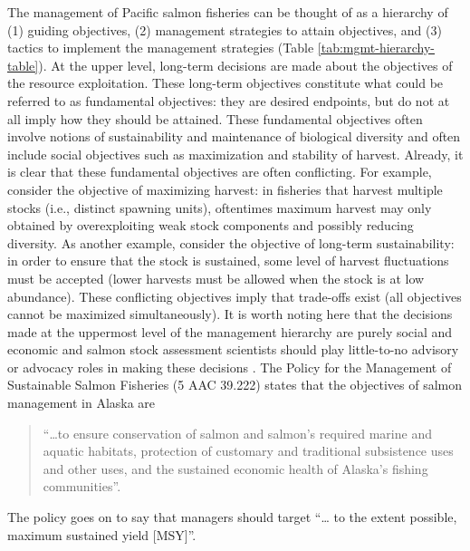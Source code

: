 \documentclass[12pt,]{book}
\theoremstyle{definition}
\theoremstyle{definition}
\theoremstyle{definition}
\theoremstyle{remark}
\begin{document}
The management of Pacific salmon fisheries can be thought of as a
hierarchy of (1) guiding objectives, (2) management strategies to attain
objectives, and (3) tactics to implement the management strategies
(Table \ref{tab:mgmt-hierarchy-table}). At the upper level, long-term
decisions are made about the objectives of the resource exploitation.
These long-term objectives constitute what could be referred to as
fundamental objectives: they are desired endpoints, but do not at all
imply how they should be attained. These fundamental objectives often
involve notions of sustainability and maintenance of biological
diversity and often include social objectives such as maximization and
stability of harvest. Already, it is clear that these fundamental
objectives are often conflicting. For example, consider the objective of
maximizing harvest: in fisheries that harvest multiple stocks (i.e.,
distinct spawning units), oftentimes maximum harvest may only obtained
by overexploiting weak stock components and possibly reducing diversity.
As another example, consider the objective of long-term sustainability:
in order to ensure that the stock is sustained, some level of harvest
fluctuations must be accepted (lower harvests must be allowed when the
stock is at low abundance). These conflicting objectives imply that
trade-offs exist (all objectives cannot be maximized simultaneously). It
is worth noting here that the decisions made at the uppermost level of
the management hierarchy are purely social and economic and salmon stock
assessment scientists should play little-to-no advisory or advocacy
roles in making these decisions \citep{walters-martell-2004}. The Policy
for the Management of Sustainable Salmon Fisheries (5 AAC 39.222) states
that the objectives of salmon management in Alaska are

\begin{quote}
``\ldots{}to ensure conservation of salmon and salmon's required marine
and aquatic habitats, protection of customary and traditional
subsistence uses and other uses, and the sustained economic health of
Alaska's fishing communities''.
\end{quote}

The policy goes on to say that managers should target ``\ldots{} to the
extent possible, maximum sustained yield {[}MSY{]}''.
\end{document}
